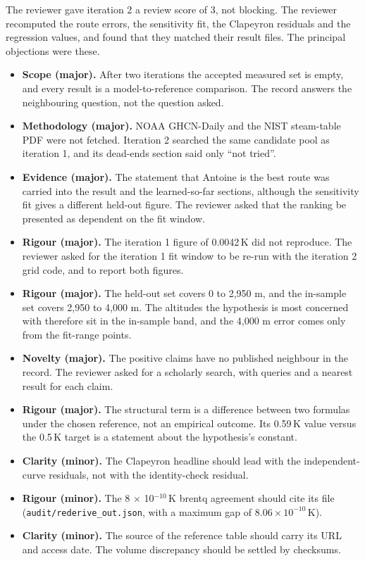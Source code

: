 \documentclass[11pt,letterpaper]{article}
\begin{document}
The reviewer gave iteration 2 a review score of 3, not blocking. The reviewer recomputed the route errors, the sensitivity fit, the Clapeyron residuals and the regression values, and found that they matched their result files. The principal objections were these.
\begin{itemize}
\item \textbf{Scope (major).} After two iterations the accepted measured set is empty, and every result is a model-to-reference comparison. The record answers the neighbouring question, not the question asked.
\item \textbf{Methodology (major).} NOAA GHCN-Daily and the NIST steam-table PDF were not fetched. Iteration 2 searched the same candidate pool as iteration 1, and its dead-ends section said only ``not tried''.
\item \textbf{Evidence (major).} The statement that Antoine is the best route was carried into the result and the learned-so-far sections, although the sensitivity fit gives a different held-out figure. The reviewer asked that the ranking be presented as dependent on the fit window.
\item \textbf{Rigour (major).} The iteration 1 figure of 0.0042\,K did not reproduce. The reviewer asked for the iteration 1 fit window to be re-run with the iteration 2 grid code, and to report both figures.
\item \textbf{Rigour (major).} The held-out set covers 0 to 2,950 m, and the in-sample set covers 2,950 to 4,000 m. The altitudes the hypothesis is most concerned with therefore sit in the in-sample band, and the 4,000 m error comes only from the fit-range points.
\item \textbf{Novelty (major).} The positive claims have no published neighbour in the record. The reviewer asked for a scholarly search, with queries and a nearest result for each claim.
\item \textbf{Rigour (major).} The structural term is a difference between two formulas under the chosen reference, not an empirical outcome. Its 0.59\,K value versus the 0.5\,K target is a statement about the hypothesis's constant.
\item \textbf{Clarity (minor).} The Clapeyron headline should lead with the independent-curve residuals, not with the identity-check residual.
\item \textbf{Rigour (minor).} The 8 $\times$ 10$^{-10}$\,K brentq agreement should cite its file (\texttt{audit/rederive\_out.json}, with a maximum gap of $8.06 \times 10^{-10}$\,K).
\item \textbf{Clarity (minor).} The source of the reference table should carry its URL and access date. The volume discrepancy should be settled by checksums.
\end{itemize}
\end{document}
